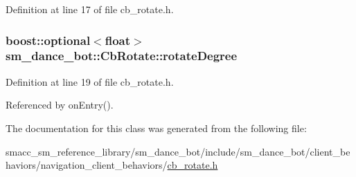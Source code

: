 Definition at line 17 of file cb\+\_\+rotate.\+h.

\subsubsection[{\texorpdfstring{rotate\+Degree}{rotateDegree}}]{\setlength{\rightskip}{0pt plus 5cm}boost\+::optional$<$float$>$ sm\+\_\+dance\+\_\+bot\+::\+Cb\+Rotate\+::rotate\+Degree}\hypertarget{classsm__dance__bot_1_1CbRotate_aede47d27b6caff0d5459afd1762ddda2}{}\label{classsm__dance__bot_1_1CbRotate_aede47d27b6caff0d5459afd1762ddda2}


Definition at line 19 of file cb\+\_\+rotate.\+h.



Referenced by on\+Entry().



The documentation for this class was generated from the following file\+:\begin{DoxyCompactItemize}
\item 
smacc\+\_\+sm\+\_\+reference\+\_\+library/sm\+\_\+dance\+\_\+bot/include/sm\+\_\+dance\+\_\+bot/client\+\_\+behaviors/navigation\+\_\+client\+\_\+behaviors/\hyperlink{cb__rotate_8h}{cb\+\_\+rotate.\+h}\end{DoxyCompactItemize}
